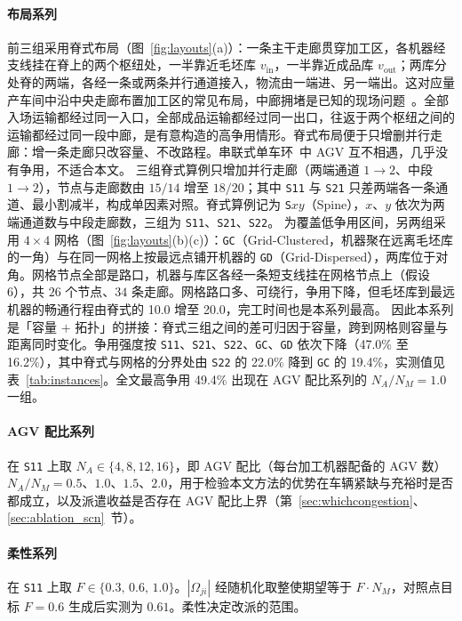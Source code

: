 \documentclass[manuscript,screen,review]{acmart}
\newcommand{\ContentionLo}{16.2\%}
\newcommand{\ContentionHi}{49.4\%}
\newcommand{\ContentionAHi}{47.0\%}
\newcommand{\ContentionALow}{19.4\%}
\newcommand{\ContentionAMid}{22.0\%}
\newcommand{\LegDumbbell}{10.0}          %
\newcommand{\LegGrid}{20.0}              %
\begin{document}
\paragraph{布局系列}
前三组采用脊式布局（图~\ref{fig:layouts}(a)）：一条主干走廊贯穿加工区，各机器经支线挂在脊上的两个枢纽处，一半靠近毛坯库 $v_{\mathrm{in}}$，一半靠近成品库 $v_{\mathrm{out}}$；两库分处脊的两端，各经一条或两条并行通道接入，物流由一端进、另一端出。这对应量产车间中沿中央走廊布置加工区的常见布局，中廊拥堵是已知的现场问题~\cite{suh2022spine}。全部入场运输都经过同一入口，全部成品运输都经过同一出口，往返于两个枢纽之间的运输都经过同一段中廊，是有意构造的高争用情形。脊式布局便于只增删并行走廊：增一条走廊只改容量、不改路程。串联式单车环~\cite{rahimikelarijani2020tandem}中 AGV 互不相遇，几乎没有争用，不适合本文。
三组脊式算例只增加并行走廊（两端通道 $1\to2$、中段 $1\to2$），节点与走廊数由 $15/14$ 增至 $18/20$；其中 \texttt{S11} 与 \texttt{S21} 只差两端各一条通道、最小割减半，构成单因素对照。脊式算例记为 \texttt{S}$xy$（Spine），$x$、$y$ 依次为两端通道数与中段走廊数，三组为 \texttt{S11}、\texttt{S21}、\texttt{S22}。
为覆盖低争用区间，另两组采用 $4\times4$ 网格（图~\ref{fig:layouts}(b)(c)）：\texttt{GC}（Grid-Clustered，机器聚在远离毛坯库的一角）与在同一网格上按最远点铺开机器的 \texttt{GD}（Grid-Dispersed），两库位于对角。网格节点全部是路口，机器与库区各经一条短支线挂在网格节点上（假设 6），共 $26$ 个节点、$34$ 条走廊。网格路口多、可绕行，争用下降，但毛坯库到最远机器的畅通行程由脊式的 \LegDumbbell{} 增至 \LegGrid{}，完工时间也是本系列最高。
因此本系列是「容量 $+$ 拓扑」的拼接：脊式三组之间的差可归因于容量，跨到网格则容量与距离同时变化。争用强度按 \texttt{S11}、\texttt{S21}、\texttt{S22}、\texttt{GC}、\texttt{GD} 依次下降（\ContentionAHi{} 至 \ContentionLo{}），其中脊式与网格的分界处由 \texttt{S22} 的 \ContentionAMid{} 降到 \texttt{GC} 的 \ContentionALow{}，实测值见表~\ref{tab:instances}。全文最高争用 \ContentionHi{} 出现在 AGV 配比系列的 $N_A/N_M=1.0$ 一组。

\paragraph{AGV 配比系列}
在 \texttt{S11} 上取 $N_A\in\{4,8,12,16\}$，即 AGV 配比（每台加工机器配备的 AGV 数）$N_A/N_M=0.5$、$1.0$、$1.5$、$2.0$，用于检验本文方法的优势在车辆紧缺与充裕时是否都成立，以及派遣收益是否存在 AGV 配比上界（第~\ref{sec:whichcongestion}、\ref{sec:ablation_scn}~节）。

\paragraph{柔性系列}
在 \texttt{S11} 上取 $F\in\{0.3,\,0.6,\,1.0\}$。$|\Omega_{ji}|$ 经随机化取整使期望等于 $F\cdot N_M$，对照点目标 $F=0.6$ 生成后实测为 $0.61$。柔性决定改派的范围。
\end{document}
